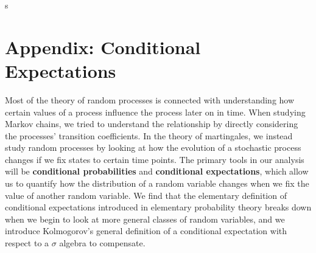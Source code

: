 s


















\chapter{Appendix: Conditional Expectations}

Most of the theory of random processes is connected with understanding how certain values of a process influence the process later on in time. When studying Markov chains, we tried to understand the relationship by directly considering the processes' transition coefficients. In the theory of martingales, we instead study random processes by looking at how the evolution of a stochastic process changes if we fix states to certain time points. The primary tools in our analysis will be {\bf conditional probabilities} and {\bf conditional expectations}, which allow us to quantify how the distribution of a random variable changes when we fix the value of another random variable. We find that the elementary definition of conditional expectations introduced in elementary probability theory breaks down when we begin to look at more general classes of random variables, and we introduce Kolmogorov's general definition of a conditional expectation with respect to a $\sigma$ algebra to compensate.

